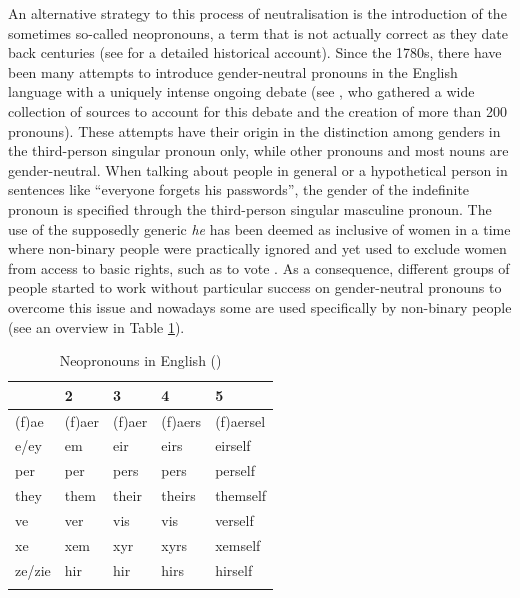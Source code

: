 An alternative strategy to this process of neutralisation is the introduction of the sometimes so-called neopronouns, a term that is not actually correct as they date back centuries (see \cite{baron2020s} for a detailed historical account). Since the 1780s, there have been many attempts to introduce gender-neutral pronouns in the English language with a uniquely intense ongoing debate (see \cite{baron2020s}, who gathered a wide collection of sources to account for this debate and the creation of more than 200 pronouns). These attempts have their origin in the distinction among genders in the third-person singular pronoun only, while other pronouns and most nouns are gender-neutral. When talking about people in general or a hypothetical person in sentences like ``everyone forgets his passwords'', the gender of the indefinite pronoun is specified through the third-person singular masculine pronoun. The use of the supposedly generic \textit{he} has been deemed as inclusive of women in a time where non-binary people were practically ignored and yet used to exclude women from access to basic rights, such as to vote \citep{baron2020s}. As a consequence, different groups of people started to work without particular success on gender-neutral pronouns to overcome this issue and nowadays some are used specifically by non-binary people (see an overview in Table \ref{tab:pronouns}). 

\begin{table}
    \caption[English non-binary pronouns]{Neopronouns in English (\cite{englishpronouns})}
    \label{tab:pronouns}
    \begin{tabular}{lllll}
    \lsptoprule
         1 & 2 & 3 & 4 & 5 \\
         \midrule
         (f)ae & (f)aer & (f)aer & (f)aers & (f)aersel  \\ 
         e/ey & em & eir & eirs & eirself \\ 
         per & per & pers & pers & perself \\ 
         they & them & their & theirs & themself \\ 
         ve & ver & vis & vis & verself \\ 
         xe & xem & xyr & xyrs & xemself \\ 
         ze/zie & hir & hir & hirs & hirself \\
\lspbottomrule
    \end{tabular}
\end{table}

